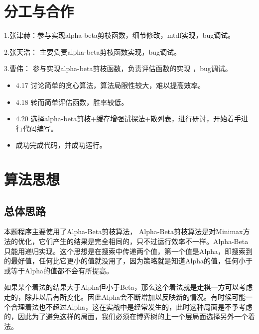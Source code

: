 \documentclass{ctexrep}
\begin{document}
\chapter{分工与合作
}
1.张津赫：参与实现alpha-beta剪枝函数，细节修改，mtdf实现，bug调试。
\vspace{0.5cm}

2.张天浩： 主要负责alpha-beta剪枝函数实现，bug调试。
\vspace{0.5cm}

3.曹伟：   参与实现alpha-beta剪枝函数，负责评估函数的实现 ，bug调试。

\vspace{1cm}


\begin{itemize}

\item 4.17 讨论简单的贪心算法，算法局限性较大，难以提高效率。

\item 4.18 转而简单评估函数，胜率较低。

\item 4.20 选择alpha-beta剪枝+缓存增强试探法+散列表，进行研讨，开始着手进行代码编写。

\item 成功完成代码，并成功运行。




\end{itemize}

\chapter{算法思想}
\section{总体思路}
 本题程序主要使用了Alpha-Beta剪枝算法， Alpha-Beta剪枝算法是对Minimax方法的优化，它们产生的结果是完全相同的，只不过运行效率不一样。Alpha-Beta只能用递归实现。这个思想是在搜索中传递两个值，第一个值是Alpha，即搜索到的最好值，任何比它更小的值就没用了，因为策略就是知道Alpha的值，任何小于或等于Alpha的值都不会有所提高。

如果某个着法的结果大于Alpha但小于Beta，那么这个着法就是走棋一方可以考虑走的，除非以后有所变化。因此Alpha会不断增加以反映新的情况。有时候可能一个合理着法也不超过Alpha，这在实战中是经常发生的，此时这种局面是不予考虑的，因此为了避免这样的局面，我们必须在博弈树的上一个层局面选择另外一个着法。
\end{document}
